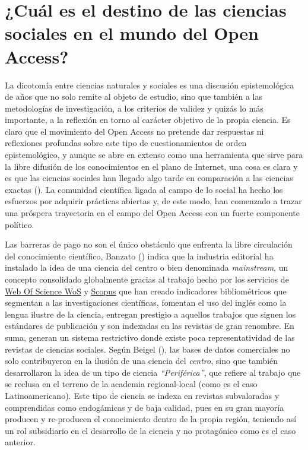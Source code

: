 \documentclass[
  spanish,
  a4paper,
  oneside]{scrbook}
\begin{document}
\chapter{¿Cuál es el destino de las ciencias sociales en el mundo del
Open
Access?}\label{cuuxe1l-es-el-destino-de-las-ciencias-sociales-en-el-mundo-del-open-access}

La dicotomía entre ciencias naturales y sociales es una discusión
epistemológica de años que no solo remite al objeto de estudio, sino que
también a las metodologías de investigación, a los criterios de validez
y quizás lo más importante, a la reflexión en torno al carácter objetivo
de la propia ciencia. Es claro que el movimiento del Open Access no
pretende dar respuestas ni reflexiones profundas sobre este tipo de
cuestionamientos de orden epistemológico, y aunque se abre en extenso
como una herramienta que sirve para la libre difusión de los
conocimientos en el plano de Internet, una cosa es clara y es que las
ciencias sociales han llegado algo tarde en comparación a las ciencias
exactas (). La comunidad
científica ligada al campo de lo social ha hecho los esfuerzos por
adquirir prácticas abiertas y, de este modo, han comenzado a trazar una
próspera trayectoria en el campo del Open Access con un fuerte
componente político.

Las barreras de pago no son el único obstáculo que enfrenta la libre
circulación del conocimiento científico, Banzato
() indica que la industria
editorial ha instalado la idea de una ciencia del centro o bien
denominada \emph{mainstream}, un concepto consolidado globalmente
gracias al trabajo hecho por los servicios de
\href{https://clarivate.com/webofsciencegroup/release-notes/wos/new-wos-admin-faq/}{Web
Of Science WoS} y
\href{https://www.elsevier.com/solutions/scopus?dgcid=RN_AGCM_Sourced_300005030}{Scopus}
que han creado indicadores bibliométricos que segmentan a las
investigaciones científicas, fomentan el uso del inglés como la lengua
ilustre de la ciencia, entregan prestigio a aquellos trabajos que siguen
los estándares de publicación y son indexadas en las revistas de gran
renombre. En suma, generan un sistema restrictivo donde existe poca
representatividad de las revistas de ciencias sociales. Según Beigel
(), las bases de datos
comerciales no solo contribuyeron en la ilusión de una ciencia del
\emph{centro}, sino que también desarrollaron la idea de un tipo de
ciencia \emph{``Periférica''}, que refiere al trabajo que se reclusa en
el terreno de la academia regional-local (como es el caso
Latinoamericano). Este tipo de ciencia se indexa en revistas
subvaloradas y comprendidas como endogámicas y de baja calidad, pues en
su gran mayoría producen y re-producen el conocimiento dentro de la
propia región, teniendo así un rol subsidiario en el desarrollo de la
ciencia y no protagónico como es el caso anterior.
\end{document}
